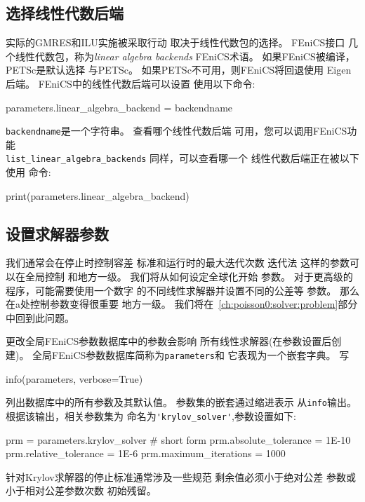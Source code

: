 

\subsection{选择线性代数后端}

实际的GMRES和ILU实施被采取行动
取决于线性代数包的选择。 FEniCS接口
几个线性代数包，称为\emph{linear algebra backends}
FEniCS术语。 如果FEniCS被编译，PETSc是默认选择
与PETSc。 如果PETSc不可用，则FEniCS将回退使用
Eigen后端。 FEniCS中的线性代数后端可以设置
使用以下命令:

\begin{python}
parameters.linear_algebra_backend = backendname
\end{python}
\texttt{backendname}是一个字符串。 查看哪个线性代数后端
可用，您可以调用FEniCS功能\\
\verb!list_linear_algebra_backends! 同样，可以查看哪一个
线性代数后端正在被以下使用
命令:

\begin{python}
print(parameters.linear_algebra_backend)
\end{python}


\subsection{设置求解器参数}

我们通常会在停止时控制容差
标准和运行时的最大迭代次数
迭代法 这样的参数可以在全局控制
和地方一级。 我们将从如何设定全球化开始
参数。 对于更高级的程序，可能需要使用一个数字
的不同线性求解器并设置不同的公差等
参数。 那么在a处控制参数变得很重要
地方一级。 我们将在~\ref{ch:poisson0:solver:problem}部分中回到此问题。

更改全局FEniCS参数数据库中的参数会影响
所有线性求解器(在参数设置后创建)。
全局FEniCS参数数据库简称为\texttt{parameters}和
它表现为一个嵌套字典。 写

\begin{python}
info(parameters, verbose=True)
\end{python}
列出数据库中的所有参数及其默认值。
参数集的嵌套通过缩进表示
从\texttt{info}输出。
根据该输出，相关参数集为
命名为\verb!'krylov_solver'!,参数设置如下:

\begin{python}
prm = parameters.krylov_solver  # short form
prm.absolute_tolerance = 1E-10
prm.relative_tolerance = 1E-6
prm.maximum_iterations = 1000
\end{python}
针对Krylov求解器的停止标准通常涉及一些规范
剩余值必须小于绝对公差
参数或小于相对公差参数次数
初始残留。

